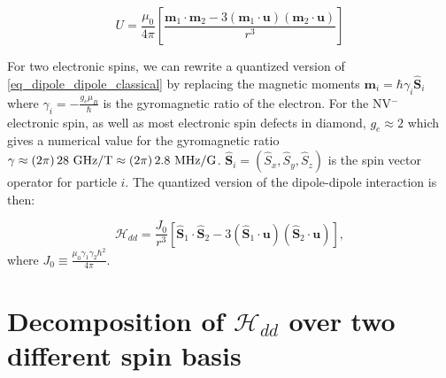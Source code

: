 \documentclass[a4paper]{report}
\begin{document}
\begin{equation}
\label{eq_dipole_dipole_classical}
U=\frac{\mu_0}{4 \pi}\left[ \frac{ \mathbf{m}_1\cdot\mathbf{m}_2 - 3 (\mathbf{m}_1\cdot\mathbf{u})(\mathbf{m}_2\cdot\mathbf{u})}{r^3}\right]
\end{equation}

For two electronic spins, we can rewrite a quantized version of \ref{eq_dipole_dipole_classical} by replacing the magnetic moments $\mathbf{m}_i=\hbar \gamma_i \hat{\mathbf{S}}_i$ where $\gamma_i=-\frac{g_e \mu_B}{\hbar}$ is the gyromagnetic ratio of the electron. For the NV$^-$ electronic spin, as well as most electronic spin defects in diamond, $g_e\approx 2$ which gives a numerical value for the gyromagnetic ratio $\gamma \approx (2\pi)\,28\ \rm{GHz/T} \approx (2\pi)\,2.8\ \rm MHz/G$. $\hat{\mathbf{S}}_i=(\hat S_x, \hat S_y, \hat S_z)$ is the spin vector operator for particle $i$. The quantized version of the dipole-dipole interaction is then:

\begin{equation}
\mathcal{H}_{dd}=\frac{J_0}{r^3}\left[ \hat{\mathbf{S}}_1\cdot\hat{\mathbf{S}}_2 - 3 (\hat{\mathbf{S}}_1\cdot\mathbf{u})(\hat{\mathbf{S}}_2\cdot\mathbf{u})\right],
\end{equation}
where $J_0\equiv \frac{\mu_0\gamma_1\gamma_2 \hbar^2}{4\pi}$. 

\section{Decomposition of $\mathcal{H}_{dd}$ over two different spin basis}


\printbibliography
\end{document}
